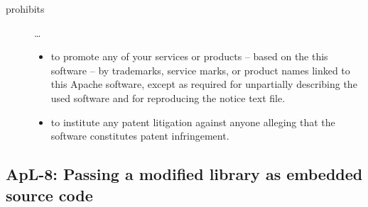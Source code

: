 \begin{description}
\begin{itemize}
\end{itemize}

\item[prohibits] \ldots
\begin{itemize}
  \item to promote any of your services or products – based on the this software
  – by trademarks, service marks, or product names linked to this Apache
  software, except as required for unpartially describing the used software and
  for reproducing the notice text file.
  \item to institute any patent litigation against anyone alleging that the
  software constitutes patent infringement.
\end{itemize}

\end{description}

\subsection{ApL-8: Passing a modified library as embedded source code}
\label{OSUC-10-Apache20}

